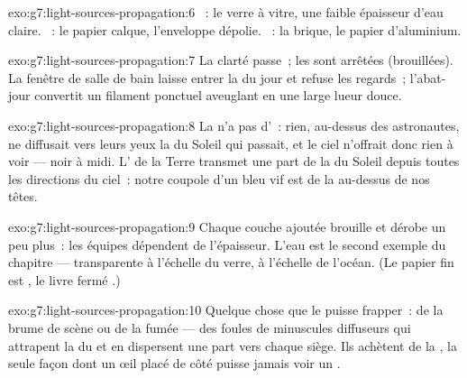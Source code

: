 \begin{solution}{exo:g7:light-sources-propagation:6}
~: le verre à vitre, une faible épaisseur d'eau claire.
~: le papier calque, l'enveloppe dépolie. ~: la
brique, le papier d'aluminium.
\end{solution}

\begin{solution}{exo:g7:light-sources-propagation:7}
La clarté passe~; les  sont arrêtées (brouillées). La fenêtre
de salle de bain laisse entrer la  du jour et refuse les
regards~; l'abat-jour convertit un filament ponctuel aveuglant en une
large lueur douce.
\end{solution}

\begin{solution}{exo:g7:light-sources-propagation:8}
La  n'a pas d'~: rien, au-dessus des astronautes, ne diffusait
vers leurs yeux la  du Soleil qui passait, et le ciel n'offrait
donc rien à voir --- noir à midi. L' de la Terre transmet une part
de la  du Soleil depuis toutes les directions du ciel~: notre
coupole d'un bleu vif est de la  au-dessus de nos têtes.
\end{solution}

\begin{solution}{exo:g7:light-sources-propagation:9}
Chaque couche ajoutée brouille et dérobe un peu plus~: les équipes
dépendent de l'épaisseur. L'eau est le second exemple du chapitre ---
transparente à l'échelle du verre,  à l'échelle de l'océan. (Le
papier fin est , le livre fermé .)
\end{solution}

\begin{solution}{exo:g7:light-sources-propagation:10}
Quelque chose que le  puisse frapper~: de la brume de scène
ou de la fumée --- des foules de minuscules diffuseurs qui attrapent
la  du  et en dispersent une part vers chaque siège.
Ils achètent de la , la seule façon dont un œil placé de
côté puisse jamais voir un .
\end{solution}

